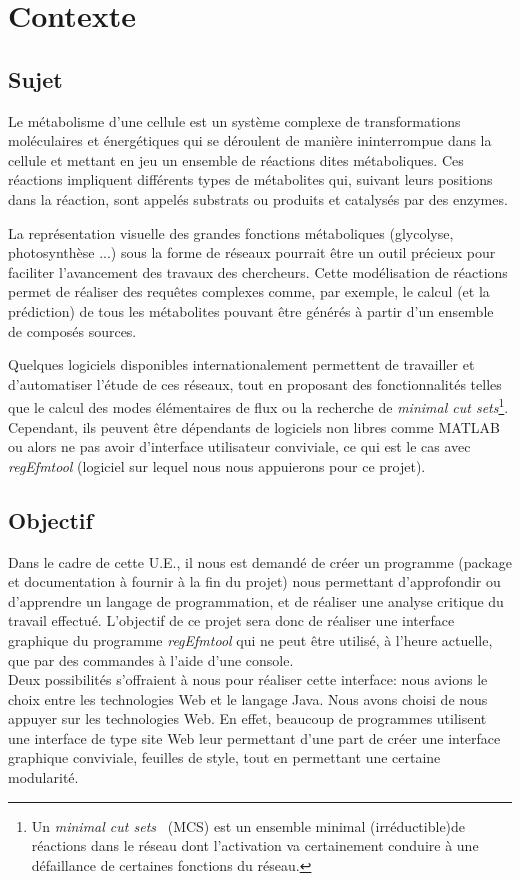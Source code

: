 \chapter{Contexte}

\section{Sujet}
Le métabolisme d'une cellule est un système complexe de transformations moléculaires et énergétiques qui se déroulent de manière ininterrompue dans la cellule et mettant en jeu un ensemble de réactions dites métaboliques. 
Ces réactions impliquent différents types de métabolites qui, suivant leurs positions dans la réaction, sont appelés substrats ou produits et catalysés par des enzymes.

La représentation visuelle des grandes fonctions métaboliques (glycolyse, photosynthèse ...) sous la forme de réseaux pourrait être un outil précieux pour faciliter l'avancement des travaux des chercheurs. Cette modélisation de réactions permet de réaliser des requêtes complexes comme, par exemple, le calcul (et la prédiction) de tous les métabolites pouvant être générés à partir d'un ensemble de composés sources.

Quelques logiciels disponibles internationalement permettent de travailler et d'automatiser l'étude de ces réseaux, tout en proposant des fonctionnalités telles que le calcul des modes élémentaires de flux ou la recherche de \textit{minimal cut sets}\footnote{Un \textit{minimal cut sets}~\cite{mcs:url} (MCS) est un ensemble minimal (irréductible)de réactions dans le réseau dont l'activation va certainement conduire à une défaillance de certaines fonctions du réseau.}.  Cependant, ils peuvent être dépendants de logiciels non libres comme MATLAB ou alors ne pas avoir d'interface utilisateur conviviale, ce qui est le cas avec  \emph{regEfmtool} (logiciel sur lequel nous nous appuierons pour ce projet).

\section{Objectif}
Dans le cadre de cette U.E., il nous est demandé de créer un programme (package et documentation à fournir à la fin du projet) nous permettant d'approfondir ou d'apprendre un langage de programmation, et de réaliser une analyse critique du travail effectué. L'objectif de ce projet sera donc de réaliser une interface graphique du programme  \emph{regEfmtool} qui ne peut être utilisé, à l'heure actuelle, que par des commandes à l'aide d'une console. \\

Deux possibilités s'offraient à nous pour réaliser cette interface: nous avions le choix entre les technologies Web et le langage Java. Nous avons choisi de nous appuyer sur les technologies Web. En effet, beaucoup de programmes utilisent une interface de type site Web leur permettant d'une part de créer une interface graphique conviviale, feuilles de style, tout en permettant une certaine modularité. 